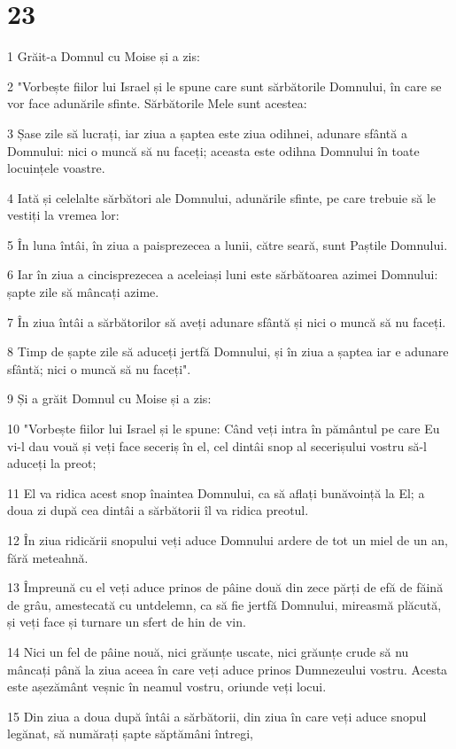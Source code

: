 \chapter{23}

\par 1 Grăit-a Domnul cu Moise și a zis:
\par 2 "Vorbește fiilor lui Israel și le spune care sunt sărbătorile Domnului, în care se vor face adunările sfinte. Sărbătorile Mele sunt acestea:
\par 3 Șase zile să lucrați, iar ziua a șaptea este ziua odihnei, adunare sfântă a Domnului: nici o muncă să nu faceți; aceasta este odihna Domnului în toate locuințele voastre.
\par 4 Iată și celelalte sărbători ale Domnului, adunările sfinte, pe care trebuie să le vestiți la vremea lor:
\par 5 În luna întâi, în ziua a paisprezecea a lunii, către seară, sunt Paștile Domnului.
\par 6 Iar în ziua a cincisprezecea a aceleiași luni este sărbătoarea azimei Domnului: șapte zile să mâncați azime.
\par 7 În ziua întâi a sărbătorilor să aveți adunare sfântă și nici o muncă să nu faceți.
\par 8 Timp de șapte zile să aduceți jertfă Domnului, și în ziua a șaptea iar e adunare sfântă; nici o muncă să nu faceți".
\par 9 Și a grăit Domnul cu Moise și a zis:
\par 10 "Vorbește fiilor lui Israel și le spune: Când veți intra în pământul pe care Eu vi-l dau vouă și veți face seceriș în el, cel dintâi snop al secerișului vostru să-l aduceți la preot;
\par 11 El va ridica acest snop înaintea Domnului, ca să aflați bunăvoință la El; a doua zi după cea dintâi a sărbătorii îl va ridica preotul.
\par 12 În ziua ridicării snopului veți aduce Domnului ardere de tot un miel de un an, fără meteahnă.
\par 13 Împreună cu el veți aduce prinos de pâine două din zece părți de efă de făină de grâu, amestecată cu untdelemn, ca să fie jertfă Domnului, mireasmă plăcută, și veți face și turnare un sfert de hin de vin.
\par 14 Nici un fel de pâine nouă, nici grăunțe uscate, nici grăunțe crude să nu mâncați până la ziua aceea în care veți aduce prinos Dumnezeului vostru. Acesta este așezământ veșnic în neamul vostru, oriunde veți locui.
\par 15 Din ziua a doua după întâi a sărbătorii, din ziua în care veți aduce snopul legănat, să numărați șapte săptămâni întregi,
